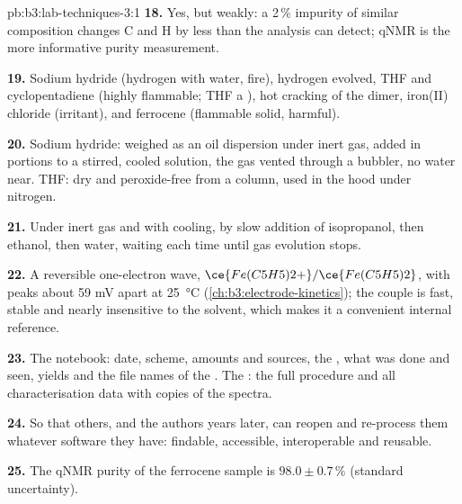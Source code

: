 \begin{solution}{pb:b3:lab-techniques-3:1}
\textbf{18.} Yes, but weakly: a 2\,\% impurity of similar composition changes C and H by less
than the analysis can detect; qNMR is the more informative purity measurement.

\textbf{19.} Sodium hydride (hydrogen with water, fire), hydrogen evolved, THF and
cyclopentadiene (highly flammable; THF a ), hot cracking of the
dimer, iron(II) chloride (irritant), and ferrocene (flammable solid, harmful).

\textbf{20.} Sodium hydride: weighed as an oil dispersion under inert gas, added in
portions to a stirred, cooled solution, the gas vented through a bubbler, no water
near. THF: dry and peroxide-free from a column, used in the hood under nitrogen.

\textbf{21.} Under inert gas and with cooling, by slow addition of isopropanol, then
ethanol, then water, waiting each time until gas evolution stops.

\textbf{22.} A reversible one-electron wave, $\ce{Fe(C5H5)2+}/\ce{Fe(C5H5)2}$, with peaks about 59 mV apart at \qty{25}{\celsius}
(\cref{ch:b3:electrode-kinetics}); the couple is fast, stable and nearly insensitive to the
solvent, which makes it a convenient internal reference.

\textbf{23.} The notebook: date, scheme, amounts and sources, the , what
was done and seen, yields and the file names of the . The : the full procedure and all characterisation data with copies of the
spectra.

\textbf{24.} So that others, and the authors years later, can reopen and re-process them
whatever software they have: findable, accessible, interoperable and reusable.

\textbf{25.} The qNMR purity of the ferrocene sample is $98.0 \pm 0.7$\,\% (standard uncertainty).
\end{solution}
